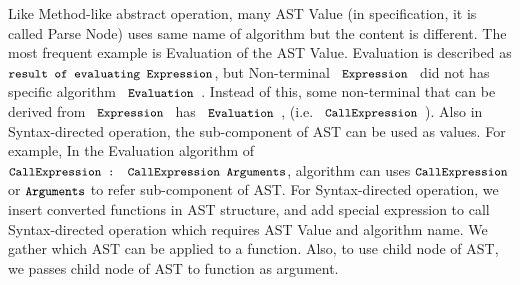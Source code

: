  Like Method-like abstract operation, many AST Value (in specification, it is called Parse Node) uses same name of algorithm but the content is different.
The most frequent example is Evaluation of the AST Value. Evaluation is described as \( \texttt{\small result of evaluating Expression} \), but Non-terminal
\( \code{ Expression } \) did not has specific algorithm \( \code{ Evaluation } \). Instead of this, some non-terminal that can be derived from \( \code{ Expression } \) has \( \code{ Evaluation }\),
(i.e. \( \code{ CallExpression } \)). Also in Syntax-directed operation, the sub-component of AST can be used as values. For example, In the
Evaluation algorithm of\\ \( \texttt{\small CallExpression : CallExpression Arguments} \), algorithm can uses \( \code{CallExpression}\) or \( \texttt{\small Arguments}\) to refer sub-component of AST.
 For Syntax-directed operation, we insert converted functions in AST structure, and add special expression to call Syntax-directed operation which requires AST Value and algorithm name.
We gather which AST can be applied to a function. Also, to use child node of AST, we passes child node of AST to function as argument.

% 
%     

% 
